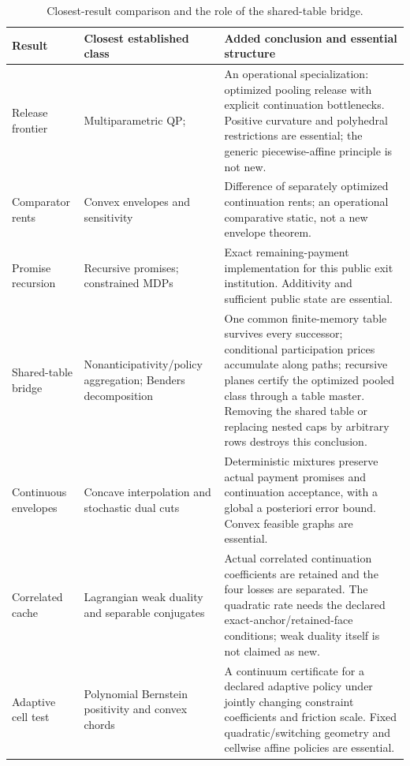 \begin{table}[t]
\centering\small
\caption{Closest-result comparison and the role of the shared-table bridge.}\label{tab:r28-novelty}
\begin{tabular}{p{}p{}p{}}
\toprule
Result & Closest established class & Added conclusion and essential structure\\\midrule
Release frontier & Multiparametric QP; \citet{Bemporad2002} & An operational specialization: optimized pooling release with explicit continuation bottlenecks. Positive curvature and polyhedral restrictions are essential; the generic piecewise-affine principle is not new.\\
Comparator rents & Convex envelopes and sensitivity & Difference of separately optimized continuation rents; an operational comparative static, not a new envelope theorem.\\
Promise recursion & Recursive promises; constrained MDPs & Exact remaining-payment implementation for this public exit institution. Additivity and sufficient public state are essential.\\
Shared-table bridge & Nonanticipativity/policy aggregation; Benders decomposition & One common finite-memory table survives every successor; conditional participation prices accumulate along paths; recursive planes certify the optimized pooled class through a table master. Removing the shared table or replacing nested caps by arbitrary rows destroys this conclusion.\\
Continuous envelopes & Concave interpolation and stochastic dual cuts & Deterministic mixtures preserve actual payment promises and continuation acceptance, with a global a posteriori error bound. Convex feasible graphs are essential.\\
Correlated cache & Lagrangian weak duality and separable conjugates & Actual correlated continuation coefficients are retained and the four losses are separated. The quadratic rate needs the declared exact-anchor/retained-face conditions; weak duality itself is not claimed as new.\\
Adaptive cell test & Polynomial Bernstein positivity and convex chords & A continuum certificate for a declared adaptive policy under jointly changing constraint coefficients and friction scale. Fixed quadratic/switching geometry and cellwise affine policies are essential.\\\bottomrule
\end{tabular}
\end{table}
